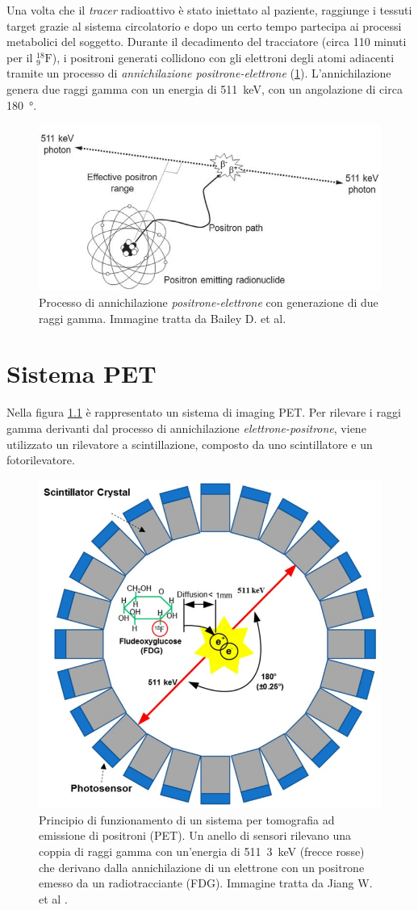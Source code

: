 Una volta che il \textit{tracer} radioattivo è stato iniettato al paziente, raggiunge i tessuti target grazie al sistema circolatorio e dopo un certo tempo partecipa ai processi metabolici del soggetto. Durante il decadimento del tracciatore (circa 110 minuti per il $^{18}_9\text{F}$), i positroni generati collidono con gli elettroni degli atomi adiacenti tramite un processo di \textit{annichilazione positrone-elettrone} (\Fig\ref{fig:annihilation}). L'annichilazione genera due raggi gamma con un energia di \SI{511}{\kilo\electronvolt}, con un angolazione di circa \SI{180}{\degree}.
\begin{figure}[h]
	\centering
	\includegraphics[width=0.8\linewidth]{./ImageFiles/annihilation}
	\caption{Processo di annichilazione \textit{positrone-elettrone} con generazione di due raggi gamma. Immagine tratta da Bailey D. et al\cite{Bailey2014}.}
	\label{fig:annihilation}
\end{figure}

\chapter{Sistema PET}
Nella figura \ref{fig:PET_imaging_system} è rappresentato un sistema di imaging PET. Per rilevare i raggi gamma derivanti dal processo di annichilazione \textit{elettrone-positrone}, viene utilizzato un rilevatore a scintillazione, composto da uno scintillatore e un fotorilevatore. 
\begin{figure}[h]
	\centering
	\includegraphics[width=0.5\linewidth]{./ImageFiles/PET_imaging_system}
	\caption{Principio di funzionamento di un sistema per tomografia ad emissione di positroni (PET). Un anello di sensori rilevano una coppia di raggi gamma con un'energia di \SI{511}{3\kilo\electronvolt} (frecce rosse) che derivano dalla annichilazione di un elettrone con un positrone emesso da un radiotracciante (FDG). Immagine tratta da Jiang W. et al \cite{Jiang2019}.}
	\label{fig:PET_imaging_system}
\end{figure}
